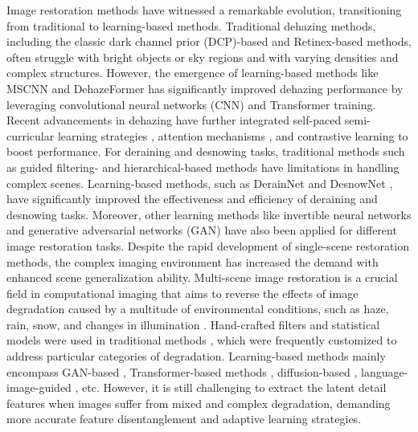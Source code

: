\documentclass[final,12pt]{elsarticle}
\begin{document}
    
    Image restoration methods have witnessed a remarkable evolution, transitioning from traditional to learning-based methods. Traditional dehazing methods, including the classic dark channel prior (DCP)-based \citep{he2010single} and Retinex-based \citep{fu2014retinex} methods, often struggle with bright objects or sky regions and with varying densities and complex structures. However, the emergence of learning-based methods like MSCNN \citep{ren2016single} and DehazeFormer \citep{song2023vision} has significantly improved dehazing performance by leveraging convolutional neural networks (CNN) and Transformer training. Recent advancements in dehazing have further integrated self-paced semi-curricular learning strategies \citep{guo2023scanet}, attention mechanisms \citep{chen2024dea}, and contrastive learning \citep{liu2024dfp} to boost performance. For deraining and desnowing tasks, traditional methods such as guided filtering- \citep{xu2012removing} and hierarchical-based \citep{wang2017hierarchical} methods have limitations in handling complex scenes. Learning-based methods, such as DerainNet \citep{fu2017clearing} and DesnowNet \citep{liu2018desnownet}, have significantly improved the effectiveness and efficiency of deraining and desnowing tasks. Moreover, other learning methods like invertible neural networks \citep{quan2023image} and generative adversarial networks (GAN) \citep{yang2022rain} have also been applied for different image restoration tasks. Despite the rapid development of single-scene restoration methods, the complex imaging environment has increased the demand with enhanced scene generalization ability. Multi-scene image restoration is a crucial field in computational imaging that aims to reverse the effects of image degradation caused by a multitude of environmental conditions, such as haze, rain, snow, and changes in illumination \citep{liu2023aioenet}. Hand-crafted filters and statistical models were used in traditional methods \citep{liu2022tape}, which were frequently customized to address particular categories of degradation. Learning-based methods mainly encompass GAN-based \citep{guo2020joint,cheng2023highway}, Transformer-based methods \citep{chen2021pre}, diffusion-based \citep{ozdenizci2023restoring,ye2024learning}, language-image-guided \citep{lin2024improving,guo2024onerestore}, etc. However, it is still challenging to extract the latent detail features when images suffer from mixed and complex degradation, demanding more accurate feature disentanglement and adaptive learning strategies.
%
\end{document}
